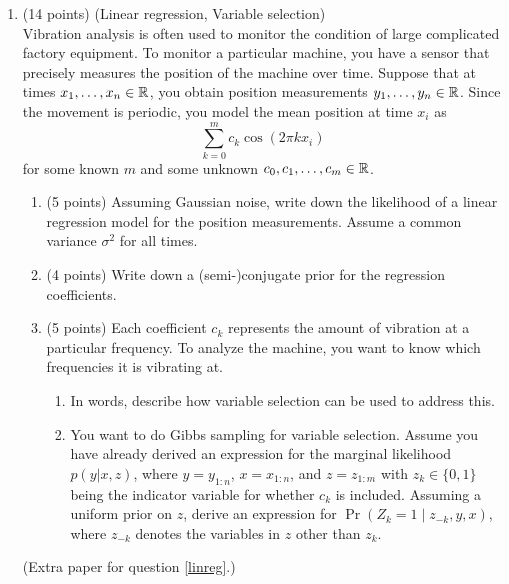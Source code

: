 \documentclass[12pt]{article}
\begin{document}
\begin{enumerate}
\newpage
\item\label{linreg} (14 points) (Linear regression, Variable selection)\\
    Vibration analysis is often used to monitor the condition of large complicated factory equipment.
    To monitor a particular machine, you have a sensor that precisely measures the position of the machine over time.
    Suppose that at times $x_1,\ldots,x_n\in\mathbb{R}$, you obtain position measurements $y_1,\ldots,y_n\in\mathbb{R}$.
    Since the movement is periodic, you model the mean position at time $x_i$ as 
    $$ \sum_{k=0}^m c_k \cos(2\pi k x_i) $$
    for some known $m$ and some unknown $c_0,c_1,\ldots,c_m\in\mathbb{R}$.
    \begin{enumerate}
        \item (5 points) Assuming Gaussian noise, write down the likelihood of a linear regression model for the position measurements.
            Assume a common variance $\sigma^2$ for all times.
        \item (4 points) Write down a (semi-)conjugate prior for the regression coefficients.
        \item (5 points) Each coefficient $c_k$ represents the amount of vibration at a particular frequency.  To analyze the machine,
            you want to know which frequencies it is vibrating at.  
        \begin{enumerate}
            \item In words, describe how variable selection can be used to address this.
            \item You want to do Gibbs sampling for variable selection.
                Assume you have already derived an expression for the marginal likelihood $p(y|x,z)$,
                where $y=y_{1:n}$, $x=x_{1:n}$, and $z=z_{1:m}$ with $z_k\in\{0,1\}$
                being the indicator variable for whether $c_k$ is included.
                Assuming a uniform prior on $z$, derive an expression for $\Pr(Z_k = 1\mid z_{-k},y,x)$,
                where $z_{-k}$ denotes the variables in $z$ other than $z_k$.
        \end{enumerate}
    \end{enumerate}
\newpage
(Extra paper for question \ref{linreg}.)
    






\end{enumerate}
\end{document}
